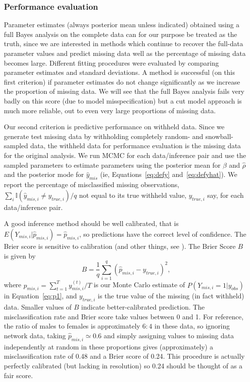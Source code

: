 \documentclass{article}
\begin{document}
\subsubsection{Performance evaluation}
Parameter estimates (always posterior mean unless indicated) obtained using a full Bayes analysis on the complete data can for our purpose be treated as the truth, since
we are interested in methods which continue to recover the full-data parameter values
and predict missing data well as the percentage of missing data becomes large. Different fitting procedures were evaluated by comparing parameter estimates and standard deviations. A method is successful (on this first criterion) if parameter estimates do not change significantly as we increase the proportion of missing data.
We will see that the full Bayes analysis fails very badly on this score (due to model misspecification) but a cut model approach is much more reliable, out to even very
large proportions of missing data.

Our second criterion is predictive performance on withheld data. Since we generate test missing data by withholding completely random- and snowball- sampled data,
the withheld data for performance evaluation is the missing data for the original analysis. 
We run MCMC for each data/inference pair and use the sampled parameters to estimate parameters using the
posterior mean for $\hat\beta$ and $\hat \rho$ and the posterior mode for $\hat{y}_{mis}$ (ie, Equations~\ref{eq:defy} and~\ref{eq:defyhat}). We report the percentage of misclassified missing observations, $\sum_i \mathbb{I}(\hat y_{mis,i}\ne y_{true,i})/q$ not equal to its true withheld value, $y_{true,i}$ say, for each data/inference pair.

A good inference method should be well calibrated, that is $E(Y_{mis,i}|\hat p_{mis,i})=\hat p_{mis,i}$, so predictions have the correct level of confidence.
The Brier score is sensitive to calibration (and other things, see \cites{sanders1963subjective, stephenson2008two}). The Brier Score $B$ is given by
\[
B=\frac{1}{q} \sum_{i=1}^{q}(\hat p_{mis,i}-y_{true,i})^2,
\]
where $\hat p_{mis,i}=\sum_{t=1}^T y^{(t)}_{mis,i}/T$ is our Monte Carlo estimate of $P(Y_{mis,i}=1|y_{obs})$ in Equation~\ref{eq:p1}, and $y_{true,i}$ is the true value of the missing (in fact withheld) data. Smaller values of $B$ indicate better-calibrated prediction.
The misclassification rate and Brier score take values between 0 and 1. For reference, the ratio of males to females is approximately $6:4$ in these data, so ignoring network data, taking $\hat p_{mis,i}\simeq 0.6$ and simply assigning values to missing data independently at random in these proportions gives (approximately) a misclassification rate of 0.48 and a Brier score of 0.24. This procedure is actually perfectly calibrated (but lacking in resolution) so 0.24 should be thought of as a fair score.
\end{document}
